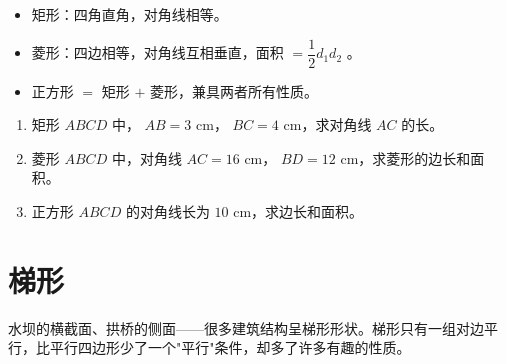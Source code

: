 \begin{keytakeaway}


\begin{itemize}
  \item 矩形：四角直角，对角线相等。
  \item 菱形：四边相等，对角线互相垂直，面积 $= \dfrac{1}{2}d_1 d_2$ 。
  \item 正方形 $=$ 矩形 $+$ 菱形，兼具两者所有性质。
\end{itemize}


\end{keytakeaway}

\begin{practice}


\begin{enumerate}
  \item 矩形 $ABCD$ 中， $AB = 3$ cm， $BC = 4$ cm，求对角线 $AC$ 的长。
  \item 菱形 $ABCD$ 中，对角线 $AC = 16$ cm， $BD = 12$ cm，求菱形的边长和面积。
  \item 正方形 $ABCD$ 的对角线长为 $10$ cm，求边长和面积。
\end{enumerate}


\end{practice}



\section*{梯形}


\begin{explore}


水坝的横截面、拱桥的侧面——很多建筑结构呈梯形形状。梯形只有一组对边平行，比平行四边形少了一个"平行"条件，却多了许多有趣的性质。

\end{explore}

